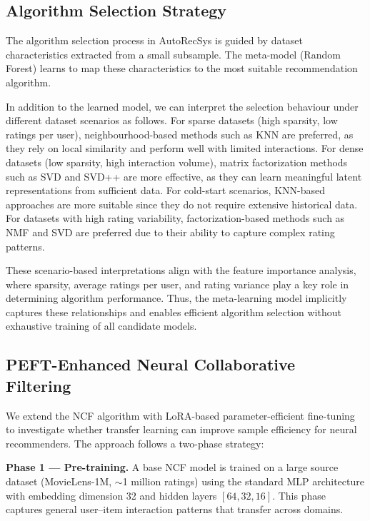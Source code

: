 \documentclass[conference]{IEEEtran}
\begin{document}
\subsection{Algorithm Selection Strategy}

The algorithm selection process in AutoRecSys is guided by dataset characteristics extracted from a small subsample. The meta-model (Random Forest) learns to map these characteristics to the most suitable recommendation algorithm.

In addition to the learned model, we can interpret the selection behaviour under different dataset scenarios as follows. For sparse datasets (high sparsity, low ratings per user), neighbourhood-based methods such as KNN are preferred, as they rely on local similarity and perform well with limited interactions. For dense datasets (low sparsity, high interaction volume), matrix factorization methods such as SVD and SVD++ are more effective, as they can learn meaningful latent representations from sufficient data. For cold-start scenarios, KNN-based approaches are more suitable since they do not require extensive historical data. For datasets with high rating variability, factorization-based methods such as NMF and SVD are preferred due to their ability to capture complex rating patterns.

These scenario-based interpretations align with the feature importance analysis, where sparsity, average ratings per user, and rating variance play a key role in determining algorithm performance. Thus, the meta-learning model implicitly captures these relationships and enables efficient algorithm selection without exhaustive training of all candidate models.

\subsection{PEFT-Enhanced Neural Collaborative Filtering}

We extend the NCF algorithm \cite{he2017ncf} with LoRA-based parameter-efficient fine-tuning \cite{hu2022lora} to investigate whether transfer learning can improve sample efficiency for neural recommenders. The approach follows a two-phase strategy:

\textbf{Phase 1 --- Pre-training.} A base NCF model is trained on a large source dataset (MovieLens-1M, $\sim$1 million ratings) using the standard MLP architecture with embedding dimension 32 and hidden layers $[64, 32, 16]$. This phase captures general user--item interaction patterns that transfer across domains.
\end{document}
